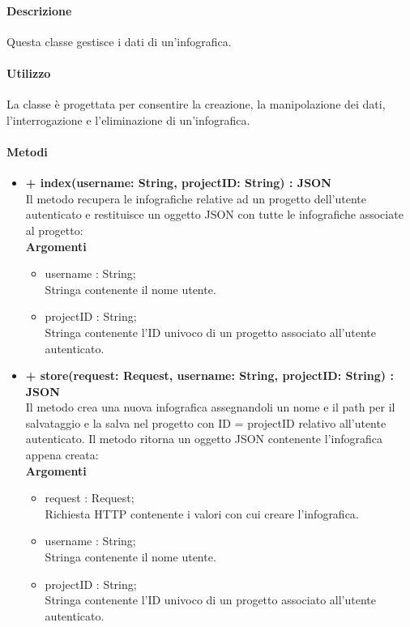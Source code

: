 	\paragraph{Descrizione}
		Questa classe gestisce i dati di un'\gls{infografica}.
	\paragraph{Utilizzo}
		La classe è progettata per consentire la creazione, la manipolazione dei dati, l'interrogazione e l'eliminazione di un'\gls{infografica}.
		
	\paragraph{Metodi}
		\begin{itemize}
			\item \textbf{+ index(username: String, projectID: String) : JSON}\\
			Il metodo recupera le infografiche relative ad un progetto dell'utente autenticato e restituisce un oggetto \gls{JSON} con tutte le infografiche associate al progetto:\\
			\textbf{Argomenti}
			\begin{itemize}
				\item username : String; \\
				Stringa contenente il nome utente.
				\item projectID : String; \\
				Stringa contenente l'ID univoco di un progetto associato all'utente autenticato.
			\end{itemize}
			
			\item \textbf{+ store(request: Request, username: String, projectID: String) : JSON}\\
			Il metodo crea una nuova \gls{infografica} assegnandoli un nome e il path per il salvataggio e la salva nel progetto con ID = projectID relativo all'utente autenticato. Il metodo ritorna un oggetto \gls{JSON} contenente l'\gls{infografica} appena creata:\\
			\textbf{Argomenti}
			\begin{itemize}
				\item request : Request;\\
				Richiesta HTTP contenente i valori con cui creare l'\gls{infografica}.
				\item username : String; \\
				Stringa contenente il nome utente.
				\item projectID : String; \\
				Stringa contenente l'ID univoco di un progetto associato all'utente autenticato.
			\end{itemize}
			

\end{itemize}

